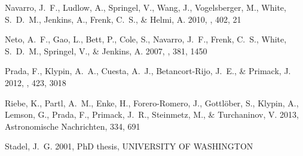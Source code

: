 \documentclass{emulateapj}
\begin{document}
\begin{thebibliography}{15}
{Navarro}, J.~F., {Ludlow}, A., {Springel}, V., {Wang}, J., {Vogelsberger}, M.,
  {White}, S.~D.~M., {Jenkins}, A., {Frenk}, C.~S., \& {Helmi}, A. 2010,
  \mnras, 402, 21

{Neto}, A.~F., {Gao}, L., {Bett}, P., {Cole}, S., {Navarro}, J.~F., {Frenk},
  C.~S., {White}, S.~D.~M., {Springel}, V., \& {Jenkins}, A. 2007, \mnras, 381,
  1450

{Prada}, F., {Klypin}, A.~A., {Cuesta}, A.~J., {Betancort-Rijo}, J.~E., \&
  {Primack}, J. 2012, \mnras, 423, 3018

{Riebe}, K., {Partl}, A.~M., {Enke}, H., {Forero-Romero}, J., {Gottl{\"o}ber},
  S., {Klypin}, A., {Lemson}, G., {Prada}, F., {Primack}, J.~R., {Steinmetz},
  M., \& {Turchaninov}, V. 2013, Astronomische Nachrichten, 334, 691

{Stadel}, J.~G. 2001, PhD thesis, UNIVERSITY OF WASHINGTON

\end{thebibliography}
\end{document}
